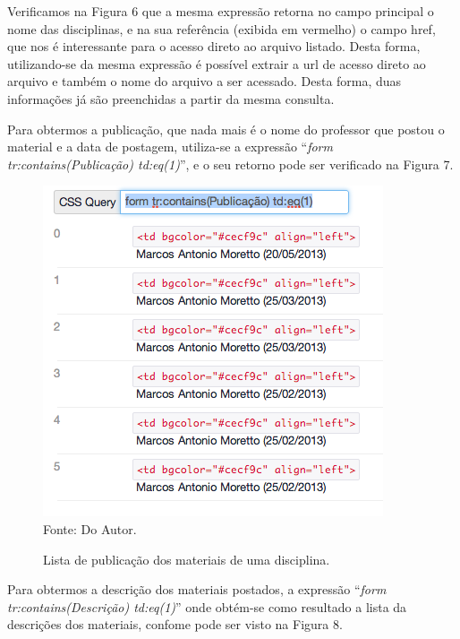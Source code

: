 Verificamos na Figura 6 que a mesma expressão retorna no campo principal o nome das disciplinas, e na sua referência (exibida em vermelho) o campo href, que nos é interessante para o acesso direto ao arquivo listado. Desta forma, utilizando-se da mesma expressão é possível extrair a url de acesso direto ao arquivo e também o nome do arquivo a ser acessado. Desta forma, duas informações já são preenchidas a partir da mesma consulta. 

Para obtermos a publicação, que nada mais é o nome do professor que postou o material e a data de postagem, utiliza-se a expressão ``\emph{form tr:contains(Publicação) td:eq(1)}'', e o seu retorno pode ser verificado na Figura 7.

\begin{figure}[!htb]
     \centering     
     \caption[Extração de Informações - Lista das publicações dos materiais]{Lista de publicação dos materiais de uma disciplina.}
     \includegraphics[scale=0.7]{imagens/listamateriaisdisciplinaspublicacao.png}
     \\  Fonte: Do Autor.
\end{figure}

Para obtermos a descrição dos materiais postados, a expressão ``\emph{form tr:contains(Descrição) td:eq(1)}'' onde obtém-se como resultado a lista da descrições dos materiais, confome pode ser visto na Figura 8.

